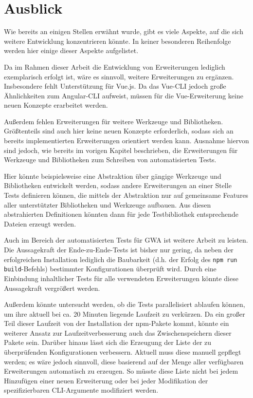 \section{Ausblick}
\label{further_research}

Wie bereits an einigen Stellen erwähnt wurde, gibt es viele Aspekte, auf die sich weitere Entwicklung konzentrieren könnte. In keiner besonderen Reihenfolge werden hier einige dieser Aspekte aufgelistet.

Da im Rahmen dieser Arbeit die Entwicklung von Erweiterungen lediglich exemplarisch erfolgt ist, wäre es sinnvoll, weitere Erweiterungen zu ergänzen. Insbesondere fehlt Unterstützung für Vue.js. Da das Vue-\gls{CLI} jedoch große Ähnlichkeiten zum Angular-\gls{CLI} aufweist, müssen für die Vue-Erweiterung keine neuen Konzepte erarbeitet werden.

Außerdem fehlen Erweiterungen für weitere Werkzeuge und Bibliotheken. Größtenteils sind auch hier keine neuen Konzepte erforderlich, sodass sich an bereits implementierten Erweiterungen orientiert werden kann. Ausnahme hiervon sind jedoch, wie bereits im vorigen Kapitel beschrieben, die Erweiterungen für Werkzeuge und Bibliotheken zum Schreiben von automatisierten Tests.

Hier könnte beispielsweise eine Abstraktion über gängige Werkzeuge und Bibliotheken entwickelt werden, sodass andere Erweiterungen an einer Stelle Tests definieren können, die mittels der Abstraktion nur auf gemeinsame Features aller unterstützter Bibliotheken und Werkzeuge aufbauen. Aus diesen abstrahierten Definitionen könnten dann für jede Testbibliothek entsprechende Dateien erzeugt werden.

Auch im Bereich der automatisierten Tests für \gls{GWA} ist weitere Arbeit zu leisten. Die Aussagekraft der Ende-zu-Ende-Tests ist bisher nur gering, da neben der erfolgreichen Installation lediglich die Baubarkeit (d.h. der Erfolg des \verb/npm run build/-Befehls) bestimmter Konfigurationen überprüft wird. Durch eine Einbindung inhaltlicher Tests für alle verwendeten Erweiterungen könnte diese Aussagekraft vergrößert werden.

Außerdem könnte untersucht werden, ob die Tests parallelisiert ablaufen können, um ihre aktuell bei ca. 20 Minuten liegende Laufzeit zu verkürzen. Da ein großer Teil dieser Laufzeit von der Installation der \gls{npm}-Pakete kommt, könnte ein weiterer Ansatz zur Laufzeitverbesserung auch das Zwischenspeichern dieser Pakete sein. Darüber hinaus lässt sich die Erzeugung der Liste der zu überprüfenden Konfigurationen verbessern. Aktuell muss diese manuell gepflegt werden; es wäre jedoch sinnvoll, diese basierend auf der Menge aller verfügbaren Erweiterungen automatisch zu erzeugen. So müsste diese Liste nicht bei jedem Hinzufügen einer neuen Erweiterung oder bei jeder Modifikation der spezifizierbaren \gls{CLI}-Argumente modifiziert werden.

